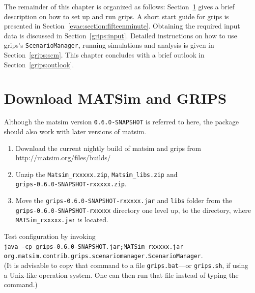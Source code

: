 The remainder of this chapter is organized as follows: Section~\ref{grips:install} gives a brief description on how to set up and run \gls{grips}. 
A short start guide for \gls{grips} is presented in Section~\ref{evac:section:fifteenminute}. Obtaining the required input data is discussed in Section~\ref{grips:input}. Detailed instructions on how to use \gls{grips}'s \lstinline|ScenarioManager|, running simulations and analysis is given in Section~\ref{grips:scm}. This chapter concludes with a brief outlook in Section~\ref{grips:outlook}.

\section{Download MATSim and GRIPS}
\label{grips:install}
Although the \gls{matsim} version \lstinline|0.6.0-SNAPSHOT| is referred to here, the package should also work with later versions of \gls{matsim}.
\begin{enumerate}
\item 
Download the current nightly build of \gls{matsim} and \gls{grips} from
\url{http://matsim.org/files/builds/}
\item 
Unzip the \lstinline|Matsim_rxxxxx.zip|, \lstinline|Matsim_libs.zip| and\\
 \lstinline|grips-0.6.0-SNAPSHOT-rxxxxx.zip|.
\item 
Move the \lstinline|grips-0.6.0-SNAPSHOT-rxxxxx.jar| and \lstinline|libs| folder from the \lstinline|grips-0.6.0-SNAPSHOT-rxxxxx| directory one level up, 
\ie to the directory, where \lstinline|MATSim_rxxxxx.jar| is located.
\end{enumerate}

Test configuration by invoking\\ 
\lstinline|java -cp grips-0.6.0-SNAPSHOT.jar;MATSim_rxxxxx.jar|\\ \lstinline|org.matsim.contrib.grips.scenariomanager.ScenarioManager|.\\
(It is advisable to copy that command to a file \lstinline|grips.bat|---or \lstinline|grips.sh|, if using a Unix-like operation system. One can then run that file instead of typing the command.)

